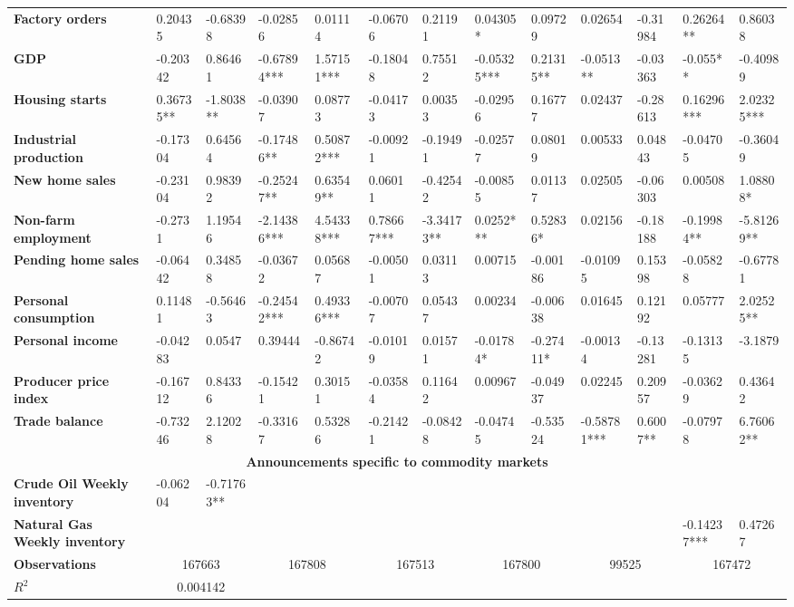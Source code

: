 \begin{sidewaystable}
{\begin{tabular}{@{}lllllllllllll@{}}
\\ \textbf{Factory orders}& 0.20435 & -0.68398 & -0.02856 & 0.01114 & -0.06706 & 0.21191 & 0.04305* & 0.09729 & 0.02654 & -0.31984 & 0.26264** & 0.86038 \\ \textbf{GDP}& -0.20342 & 0.86461 & -0.67894*** & 1.57151*** & -0.18048 & 0.75512 & -0.05325*** & 0.21315** & -0.0513** & -0.03363 & -0.055** & -0.40989 \\ \textbf{Housing starts}& 0.36735**& -1.8038**& -0.03907 & 0.08773 & -0.04173 & 0.00353 & -0.02956 & 0.16777 & 0.02437 & -0.28613 & 0.16296*** & 2.02325*** \\ \textbf{Industrial production}& -0.17304 & 0.64564 & -0.17486**& 0.50872***& -0.00921 & -0.19491 & -0.02577 & 0.08019 & 0.00533 & 0.04843 & -0.04705 & -0.36049 \\ \textbf{New home sales}& -0.23104 & 0.98392 & -0.25247**& 0.63549**& 0.06011 & -0.42542 & -0.00855 & 0.01137 & 0.02505 & -0.06303 & 0.00508 & 1.08808* \\ \textbf{Non-farm employment}& -0.2731 & 1.19546 & -2.14386*** & 4.54338*** & 0.78667***& -3.34173**& 0.0252*** & 0.52836* & 0.02156 & -0.18188 & -0.19984** & -5.81269** \\ \textbf{Pending home sales}& -0.06442 & 0.34858 & -0.03672 & 0.05687 & -0.00501 & 0.03113 & 0.00715 & -0.00186 & -0.01095 & 0.15398 & -0.05828 & -0.67781 \\ \textbf{Personal consumption}& 0.11481 & -0.56463 & -0.24542*** & 0.49336*** & -0.00707 & 0.05437 & 0.00234 & -0.00638 & 0.01645 & 0.12192 & 0.05777 & 2.02525** \\ \textbf{Personal income}& -0.04283 & 0.0547 & 0.39444 & -0.86742 & -0.01019 & 0.01571 & -0.01784* & -0.27411* & -0.00134 & -0.13281 & -0.13135 & -3.1879 \\ \textbf{Producer price index}& -0.16712 & 0.84336 & -0.15421 & 0.30151 & -0.03584 & 0.11642 & 0.00967 & -0.04937 & 0.02245 & 0.20957 & -0.03629 & 0.43642 \\ \textbf{Trade balance}& -0.73246 & 2.12028 & -0.33167 & 0.53286 & -0.21421 & -0.08428 & -0.04745 & -0.53524 & -0.58781*** & 0.6007** & -0.07978 & 6.76062** \\  \midrule \multicolumn{13}{c}{\textbf{Announcements specific to commodity markets}} \\ \midrule \textbf{Crude Oil Weekly inventory}& -0.06204 & -0.71763** &  &  &  &  &  &  &  &  &  &  \\ \textbf{Natural Gas Weekly inventory}&  &  &  &  &  &  &  &  &  &  & -0.14237*** & 0.47267 \\  \midrule \textbf{Observations}             &\multicolumn{2}{c}{ 167663 }                                                 & \multicolumn{2}{c}{ 167808 }                                                 & \multicolumn{2}{c}{ 167513 }                                                 & \multicolumn{2}{c}{ 167800 }                                                 & \multicolumn{2}{c}{ 99525 }                                                   & \multicolumn{2}{c}{ 167472 }                                                 \\ \textbf{$R^2$}             &\multicolumn{2}{c}{ 0.004142 }                
\end{tabular}}
\end{sidewaystable}
